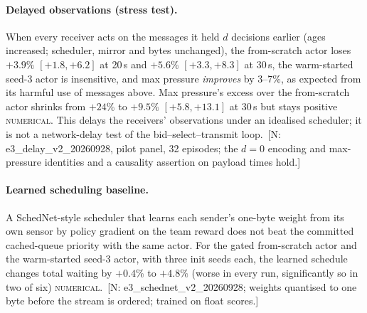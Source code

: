 \documentclass[11pt]{article}
\theoremstyle{definition}
\newcommand{\NUM}{\textsc{numerical}}
\newif\ifshownotes\shownotestrue
\newcommand{\NOTE}[1]{\ifshownotes{\color{notecol}\,\textsf{\footnotesize[N: #1]}}\fi}
\begin{document}
\paragraph{Delayed observations (stress test).} When every receiver acts on the messages it held $d$
decisions earlier (ages increased; scheduler, mirror and bytes unchanged), the from-scratch actor loses
$+3.9\%$ $[+1.8,+6.2]$ at 20\,s and $+5.6\%$ $[+3.3,+8.3]$ at 30\,s, the warm-started seed-3 actor is
insensitive, and max pressure \emph{improves} by 3--7\%, as expected from its harmful use of messages
above. Max pressure's excess over the from-scratch actor
shrinks from $+24\%$ to $+9.5\%$ $[+5.8,+13.1]$ at 30\,s but stays positive \NUM. This delays the
receivers' observations under an idealised scheduler; it is not a network-delay test of the
bid--select--transmit loop. \NOTE{e3\_delay\_v2\_20260928, pilot panel, 32 episodes; the $d=0$ encoding
and max-pressure identities and a causality assertion on payload times hold.}

\paragraph{Learned scheduling baseline.} A SchedNet-style scheduler that learns each sender's one-byte
weight from its own sensor by policy gradient on the team reward does not beat the committed
cached-queue priority with the same actor. For the gated from-scratch actor and the warm-started seed-3
actor, with three init seeds each, the learned schedule changes total waiting by $+0.4\%$ to $+4.8\%$
(worse in every run, significantly so in two of six) \NUM. \NOTE{e3\_schednet\_v2\_20260928; weights
quantised to one byte before the stream is ordered; trained on float scores.}
\end{document}
